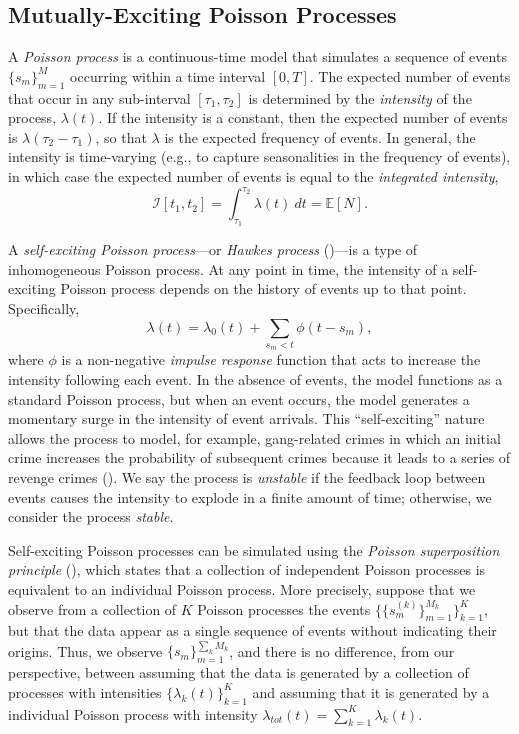 	\subsection{Mutually-Exciting Poisson Processes}
		A \textit{Poisson process} is a continuous-time model that simulates a sequence of events $\{s_m\}_{m=1}^M$ occurring within a time interval $\left[0, T\right]$. The expected number of events that occur in any sub-interval $[\tau_1, \tau_2]$ is determined by the \textit{intensity} of the process, $\lambda(t)$. If the intensity is a constant, then the expected number of events is $\lambda (\tau_2 - \tau_1)$, so that $\lambda$ is the expected frequency of events. In general, the intensity is time-varying (e.g., to capture seasonalities in the frequency of events), in which case the expected number of events is equal to the \textit{integrated intensity},
		\begin{equation}
			\mathcal{I}\left[t_1, t_2\right] = \int_{\tau_1}^{\tau_2} \lambda(t) \ dt = \mathbb{E} \left[ N \right].
		\end{equation}

		A \textit{self-exciting Poisson process}---or \textit{Hawkes process} (\cite{Hawkes1971})---is a type of inhomogeneous Poisson process. At any point in time, the intensity of a self-exciting Poisson process depends on the history of events up to that point. Specifically,
		\begin{equation}
			\lambda(t) = \lambda_0(t) + \sum_{s_m < t} \phi(t - s_m),
		\end{equation}
		where $\phi$ is a non-negative \textit{impulse response} function that acts to increase the intensity following each event. In the absence of events, the model functions as a standard Poisson process, but when an event occurs, the model generates a momentary surge in the intensity of event arrivals. This ``self-exciting'' nature allows the process to model, for example, gang-related crimes in which an initial crime increases the probability of subsequent crimes because it leads to a series of revenge crimes (\cite{Cho2013}). We say the process is \textit{unstable} if the feedback loop between events causes the intensity to explode in a finite amount of time; otherwise, we consider the process \textit{stable}.

		Self-exciting Poisson processes can be simulated using the \textit{Poisson superposition principle} (\cite{Kingman1993}), which states that a collection of independent Poisson processes is equivalent to an individual Poisson process. More precisely, suppose that we observe from a collection of $K$ Poisson processes the events $\{ \{ s_m^{(k)} \}_{m=1}^{M_k} \}_{k=1}^K$, but that the data appear as a single sequence of events without indicating their origins. Thus, we observe $\{ s_m \}_{m=1}^{\sum_k M_k}$, and there is no difference, from our perspective, between assuming that the data is generated by a collection of processes with intensities $\{\lambda_k(t)\}_{k=1}^K$ and assuming that it is generated by a individual Poisson process with intensity $\lambda_{tot}(t) = \sum_{k=1}^K \lambda_k(t)$.

